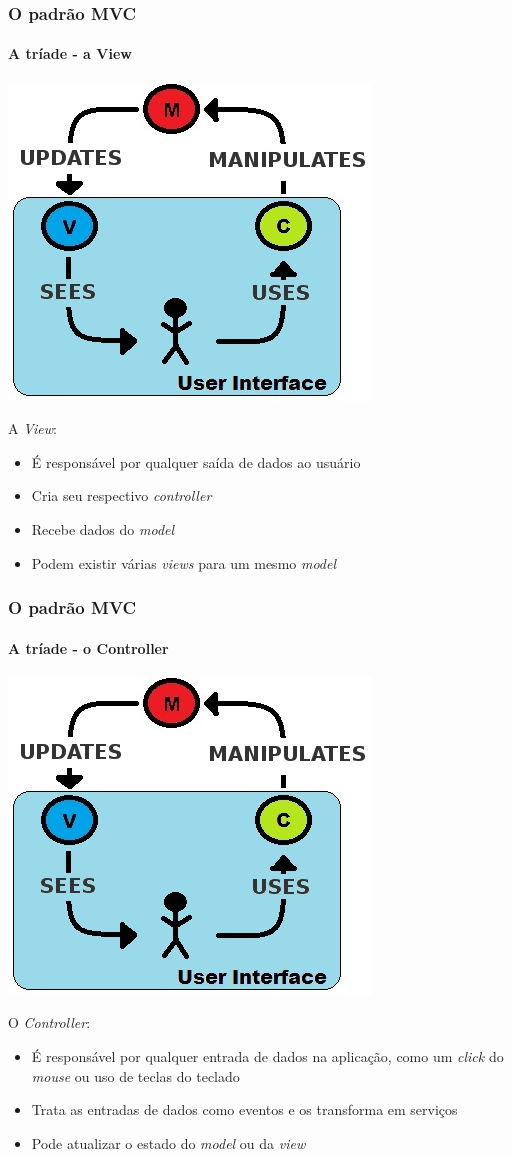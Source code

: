 \documentclass{beamer}
\begin{document}
\begin{frame}
\frametitle{O padrão MVC}
\framesubtitle{A tríade - a View}
\begin{center}
	\includegraphics[scale=0.4]{MVC.jpg}
\end{center}
A \textit{View}:
\begin{itemize}
  \item {É responsável por qualquer saída de dados ao usuário}
  \item {Cria seu respectivo \textit{controller}}
  \item {Recebe dados do \textit{model}}
  \item {Podem existir várias \textit{views} para um mesmo \textit{model}}
\end{itemize}
\end{frame}

\begin{frame} [shrink=10]
\frametitle{O padrão MVC}
\framesubtitle{A tríade - o Controller}
\begin{center}
	\includegraphics[scale=0.4]{MVC.jpg}
\end{center}
O \textit{Controller}: 
\begin{itemize}
  \item {É responsável por qualquer entrada de dados na aplicação, como um \textit{click} do \textit{mouse} ou uso de teclas do teclado}
  \item {Trata as entradas de dados como eventos e os transforma em serviços}
  \item {Pode atualizar o estado do \textit{model} ou da \textit{view}}
\end{itemize}
\end{frame}
\end{document}
